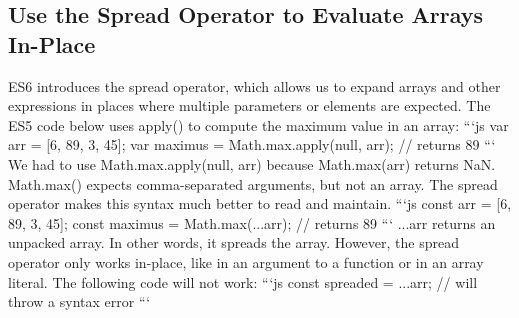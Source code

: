 \documentclass{article}%
\begin{document}
\subsection{Use the Spread Operator to Evaluate Arrays In{-}Place}%
\label{subsec:UsetheSpreadOperatortoEvaluateArraysIn{-}Place}%
ES6 introduces the spread operator, which allows us to expand arrays and other expressions in places where multiple parameters or elements are expected.\newline%
The ES5 code below uses apply() to compute the maximum value in an array:\newline%
```js\newline%
var arr = {[}6, 89, 3, 45{]};\newline%
var maximus = Math.max.apply(null, arr); // returns 89\newline%
```\newline%
We had to use Math.max.apply(null, arr) because Math.max(arr) returns NaN. Math.max() expects comma{-}separated arguments, but not an array.\newline%
The spread operator makes this syntax much better to read and maintain.\newline%
```js\newline%
const arr = {[}6, 89, 3, 45{]};\newline%
const maximus = Math.max(...arr); // returns 89\newline%
```\newline%
...arr returns an unpacked array. In other words, it spreads the array.\newline%
However, the spread operator only works in{-}place, like in an argument to a function or in an array literal. The following code will not work:\newline%
```js\newline%
const spreaded = ...arr; // will throw a syntax error\newline%
```\newline%

%
\end{document}
